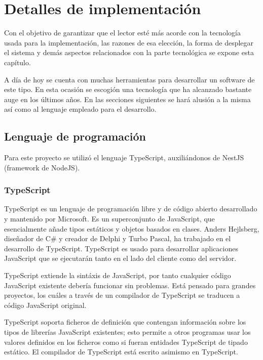 \chapter{Detalles de implementación}\label{cap:implementation_details}

Con el objetivo de garantizar que el lector esté más acorde con la tecnología usada para la implementación, las razones de esa elección, la forma de desplegar el sistema y demás aspectos relacionados con la parte tecnológica se expone esta capítulo.

A día de hoy se cuenta con muchas herramientas para desarrollar un software de este tipo. En esta ocasión se escogión una tecnología que ha alcanzado bastante auge en los últimos años. En las secciones siguientes se hará alusión a la misma así como al lenguaje empleado para el desarrollo.

\section{Lenguaje de programación}
Para este proyecto se utilizó el lenguaje TypeScript, auxiliándonos de NestJS (framework de NodeJS).

\subsection{TypeScript}
\label{lenguage}
\cite{wiki_ts}
TypeScript es un lenguaje de programación libre y de código abierto desarrollado y mantenido por Microsoft. Es un superconjunto de JavaScript, que esencialmente añade tipos estáticos y objetos basados en clases. Anders Hejlsberg, diseñador de C\# y creador de Delphi y Turbo Pascal, ha trabajado en el desarrollo de TypeScript. TypeScript es usado para desarrollar aplicaciones JavaScript que se ejecutarán tanto en el lado del cliente como del servidor.

TypeScript extiende la sintáxis de JavaScript, por tanto cualquier código JavaScript existente debería  funcionar sin problemas. Está pensado para grandes proyectos, los cuáles a través de un compilador de TypeScript se traducen a código JavaScript original. 

TypeScript soporta ficheros de definición que contengan información sobre los tipos de librerías JavaScript existentes; esto permite a otros programas usar los valores definidos en los ficheros como si fueran entidades TypeScript de tipado estático. El compilador de TypeScript está escrito asimismo en TypeScript. 


